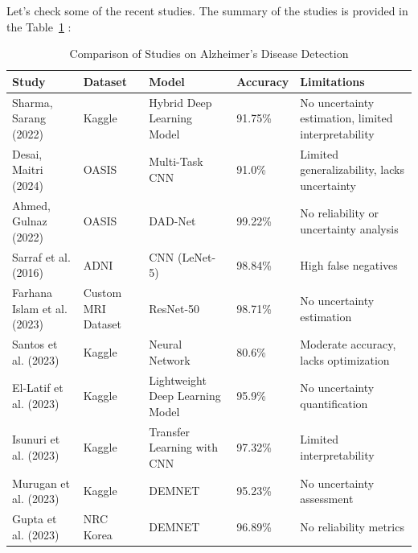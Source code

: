 \documentclass[12pt,twocolumn]{report}
\begin{document}
Let's check some of the recent studies. The summary of the studies is provided in the Table~\ref{tab:methods_comparison} :
\begin{table}[h!]
    \centering
    \caption{Comparison of Studies on Alzheimer’s Disease Detection}
    \label{tab:methods_comparison}
    \begin{tabular}{|p{3cm}|p{3cm}|p{3cm}|p{2cm}|p{4cm}|}
        \hline
        \textbf{Study} & \textbf{Dataset} & \textbf{Model} & \textbf{Accuracy} & \textbf{Limitations} \\ \hline
        Sharma, Sarang (2022) \cite{2022Sarang} & Kaggle & Hybrid Deep Learning Model & 91.75\% & No uncertainty estimation, limited interpretability \\ \hline
        Desai, Maitri (2024) \cite{2024Desai} & OASIS & Multi-Task CNN & 91.0\% & Limited generalizability, lacks uncertainty \\ \hline
        Ahmed, Gulnaz (2022) \cite{2022Ahmed} & OASIS & DAD-Net & 99.22\% & No reliability or uncertainty analysis \\ \hline
        Sarraf et al. (2016) \cite{sarraf2016} & ADNI & CNN (LeNet-5) & 98.84\% & High false negatives \\ \hline
        Farhana Islam et al. (2023) \cite{Islam2023} & Custom MRI Dataset & ResNet-50 & 98.71\% & No uncertainty estimation \\ \hline
        Santos et al. (2023)  \cite{Santos2023} & Kaggle & Neural Network & 80.6\% & Moderate accuracy, lacks optimization \\ \hline
        El-Latif et al. (2023) \cite{Latif2023} & Kaggle & Lightweight Deep Learning Model & 95.9\% & No uncertainty quantification \\ \hline
        Isunuri et al. (2023) \cite{Isunuri2023} & Kaggle & Transfer Learning with CNN & 97.32\% & Limited interpretability \\ \hline
        Murugan et al. (2023) \cite{Murugan2021} & Kaggle & DEMNET & 95.23\% & No uncertainty assessment \\ \hline
        Gupta et al. (2023) \cite{Gupta2019} & NRC Korea & DEMNET & 96.89\% & No reliability metrics \\ \hline
    \end{tabular}
\end{table}
\end{document}
